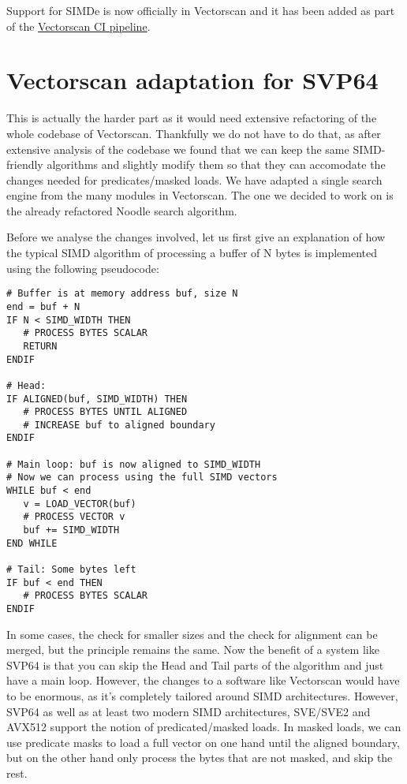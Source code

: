 Support for SIMDe is now officially in Vectorscan and it has been added as part of the
\href{https://buildbot-ci.vectorcamp.gr/#/grid}{Vectorscan CI pipeline}.
\par

\section{Vectorscan adaptation for SVP64}

This is actually the harder part as it would need extensive refactoring of the whole codebase of Vectorscan.
Thankfully we do not have to do that, as after extensive analysis of the codebase we found that we can keep the same \acrshort{SIMD}-friendly algorithms
and slightly modify them so that they can accomodate the changes needed for predicates/masked loads.
We have adapted a single search engine from the many modules in Vectorscan.
The one we decided to work on is the already refactored Noodle search algorithm.
\par

Before we analyse the changes involved, let us first give an explanation of how the typical \acrshort{SIMD} algorithm
of processing a buffer of N bytes is implemented using the following pseudocode:

\begin{verbatim}
# Buffer is at memory address buf, size N
end = buf + N
IF N < SIMD_WIDTH THEN
   # PROCESS BYTES SCALAR
   RETURN
ENDIF

# Head:
IF ALIGNED(buf, SIMD_WIDTH) THEN
   # PROCESS BYTES UNTIL ALIGNED
   # INCREASE buf to aligned boundary
ENDIF

# Main loop: buf is now aligned to SIMD_WIDTH
# Now we can process using the full SIMD vectors
WHILE buf < end
   v = LOAD_VECTOR(buf)
   # PROCESS VECTOR v
   buf += SIMD_WIDTH
END WHILE

# Tail: Some bytes left
IF buf < end THEN
   # PROCESS BYTES SCALAR
ENDIF
\end{verbatim}

In some cases, the check for smaller sizes and the check for alignment can be merged, but the principle remains the same.
Now the benefit of a system like \acrshort{SVP64} is that you can skip the Head and Tail parts of the algorithm and just have a main loop.
However, the changes to a software like Vectorscan would have to be enormous, as it's completely tailored around SIMD architectures.
However, \acrshort{SVP64} as well as at least two modern \acrshort{SIMD} architectures,
\acrshort{SVE}/\acrshort{SVE2} and \acrshort{AVX512} support the notion of predicated/masked loads.
In masked loads, we can use predicate masks to load a full vector on one hand until the aligned boundary,
but on the other hand only process the bytes that are not masked, and skip the rest.
\par

